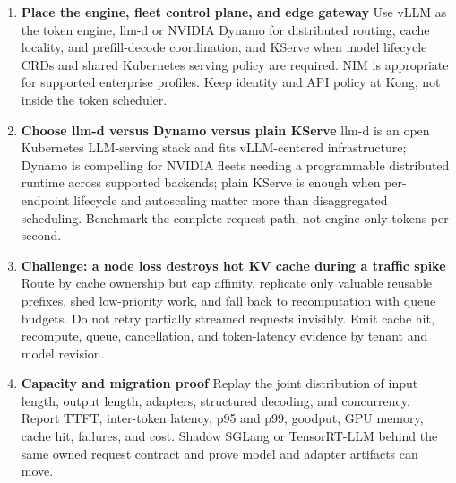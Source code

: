 \begin{enumerate}
\item \textbf{Place the engine, fleet control plane, and edge gateway} Use vLLM as the token engine, llm-d or NVIDIA Dynamo for distributed routing, cache locality, and prefill-decode coordination, and KServe when model lifecycle CRDs and shared Kubernetes serving policy are required. NIM is appropriate for supported enterprise profiles. Keep identity and API policy at Kong, not inside the token scheduler.
\item \textbf{Choose llm-d versus Dynamo versus plain KServe} llm-d is an open Kubernetes LLM-serving stack and fits vLLM-centered infrastructure; Dynamo is compelling for NVIDIA fleets needing a programmable distributed runtime across supported backends; plain KServe is enough when per-endpoint lifecycle and autoscaling matter more than disaggregated scheduling. Benchmark the complete request path, not engine-only tokens per second.
\item \textbf{Challenge: a node loss destroys hot KV cache during a traffic spike} Route by cache ownership but cap affinity, replicate only valuable reusable prefixes, shed low-priority work, and fall back to recomputation with queue budgets. Do not retry partially streamed requests invisibly. Emit cache hit, recompute, queue, cancellation, and token-latency evidence by tenant and model revision.
\item \textbf{Capacity and migration proof} Replay the joint distribution of input length, output length, adapters, structured decoding, and concurrency. Report TTFT, inter-token latency, p95 and p99, goodput, GPU memory, cache hit, failures, and cost. Shadow SGLang or TensorRT-LLM behind the same owned request contract and prove model and adapter artifacts can move.
\end{enumerate}
